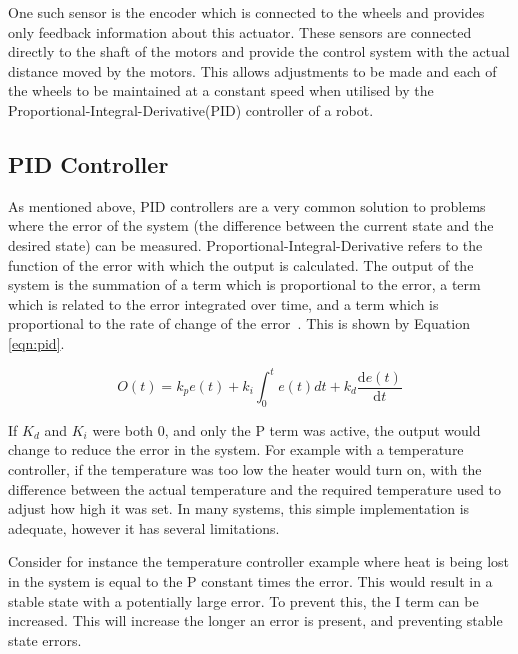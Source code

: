 One such sensor is the encoder which is connected to the wheels and provides 
only feedback information about this actuator. These sensors are connected 
directly to the shaft of the motors and provide the control system with the 
actual distance moved by the motors. This allows adjustments to be made and each 
of the wheels to be maintained at a constant speed when utilised by the 
Proportional-Integral-Derivative(PID) controller of a robot.  

\subsection{PID Controller}\label{litreview/robotics/pid}
As mentioned above, PID controllers are a very common solution to problems where the error of the 
system (the difference between the current state and the desired state) can be 
measured. Proportional-Integral-Derivative refers to the 
function of the error with which the output is calculated. The output of the 
system is the summation of a term which is proportional to the error, a term 
which is related to the error integrated over time, and a term which is 
proportional to the rate of change of the error~\cite{aastrom2006advanced}. This is shown by Equation \ref{eqn:pid}.

\begin{equation}
\label{eqn:pid}
O(t) = k_{p}e(t) + k_i\int_{0}^{t}e(t)dt + k_d \frac{\mathrm{d} e(t) }{\mathrm{d} t}
\end{equation}

If $K_d$ and $K_i$ were both 0, and only the P term was active, the output 
would change to reduce the error in the system. For example with a
temperature controller, if the temperature was too low the heater would
turn on, with the difference between the actual temperature and the required 
temperature used to adjust how high it was set. In many systems, this simple 
implementation is adequate, however it has several limitations. 

Consider for instance the temperature controller example where heat is being
lost in the system is equal to the P constant times the error. This would
result in a stable state with a potentially large error. To prevent this,
the I term can be increased. This will increase the longer an error is
present, and preventing stable state errors. 

